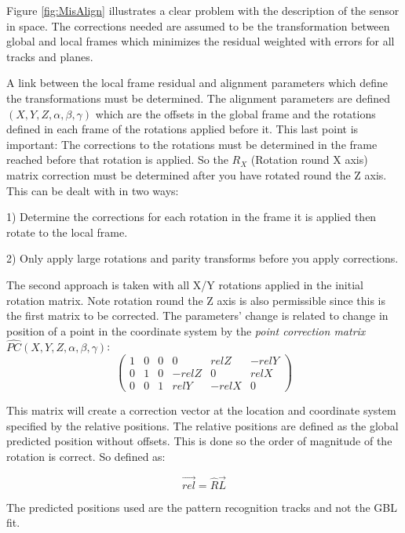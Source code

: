 Figure \ref{fig:MisAlign} illustrates a clear problem with the description of the sensor in space. The corrections needed are assumed to be the transformation between global and local frames which minimizes the residual weighted with errors for all tracks and planes.

A link between the local frame residual and alignment parameters which define the transformations must be determined. The alignment parameters are defined $(X,Y,Z, \alpha,\beta,\gamma)$ which are the offsets in the global frame and the rotations defined in each frame of the rotations applied before it. This last point is important: The corrections to the rotations must be determined in the frame reached before that rotation is applied. So the $R_X$ (Rotation round X axis) matrix correction must be determined after you have rotated round the Z axis. This can be dealt with in two ways: 

1) Determine the corrections for each rotation in the frame it is applied then rotate to the local frame. 

2) Only apply large rotations and parity transforms before you apply corrections. 

The second approach is taken with all X/Y rotations applied in the initial rotation matrix. Note rotation round the Z axis is also permissible since this is the first matrix to be corrected. The parameters' change is related to change in position of a point in the coordinate system by the  \emph{point correction matrix} $\hat{PC}(X,Y,Z, \alpha,\beta,\gamma)$:
\[ \left( \begin{array}{cccccc}
1 & 0 & 0 & 0 & relZ & -relY \\
0 & 1 & 0 & -relZ & 0 & relX  \\
0 & 0 & 1 & relY & -relX & 0   
  \label{eq:PC}
\end{array}
 \right)\] 

This matrix will create a correction vector at the location and coordinate system specified by the relative positions. 
The relative positions are defined as the global predicted position without offsets. This is done so the order of magnitude of the rotation is correct. So defined as:

\begin{equation}
 \overrightarrow{rel} =   \hat{R}\overrightarrow{L} 
\end{equation}

The predicted positions used are the pattern recognition tracks and not the GBL fit.  

